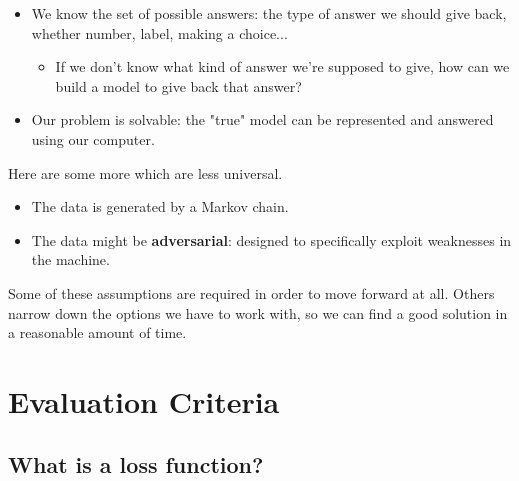             \begin{itemize}
                \item We know the set of possible answers: the type of answer we should give back, whether number, label, making a choice...
                    \begin{itemize}
                        \item If we don't know what kind of answer we're supposed to give, how can we build a model to give back that answer? 
                    \end{itemize}
                    
                \item Our problem is solvable: the "true" model can be represented and answered using our computer.
                        
            \end{itemize}
            
        Here are some more which are less universal.
        
        \begin{itemize}
            \item The data is generated by a Markov chain. 
            
            \item The data might be \textbf{adversarial}: designed to specifically exploit weaknesses in the machine.
        \end{itemize}
            
        Some of these assumptions are required in order to move forward at all. Others narrow down the options we have to work with, so we can find a good solution in a reasonable amount of time.
        
\pagebreak

\section{Evaluation Criteria}
    
    \subsection{What is a loss function?}
    
